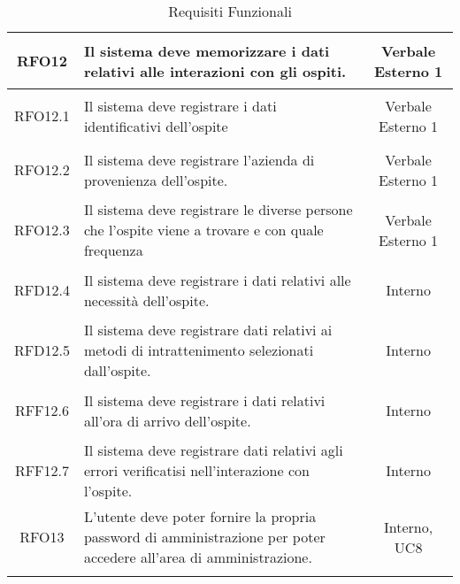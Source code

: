 \begin{longtable}{|c|>{\centering}m{7cm}|c|}
\hypertarget{RFO12}{RFO12} & Il sistema deve memorizzare i dati relativi alle interazioni con gli ospiti. & Verbale Esterno 1\\ \hline
\hypertarget{RFO12.1}{RFO12.1} & Il sistema deve registrare i dati identificativi dell'ospite & Verbale Esterno 1\\ \hline
\hypertarget{RFO12.2}{RFO12.2} & Il sistema deve registrare l'azienda di provenienza dell'ospite. & Verbale Esterno 1\\ \hline
\hypertarget{RFO12.3}{RFO12.3} & Il sistema deve registrare le diverse persone che l'ospite viene a trovare e con quale frequenza & Verbale Esterno 1\\ \hline
\hypertarget{RFD12.4}{RFD12.4} & Il sistema deve registrare i dati relativi alle necessità  dell'ospite. & Interno\\ \hline
\hypertarget{RFD12.5}{RFD12.5} & Il sistema deve registrare dati relativi ai metodi di intrattenimento selezionati dall'ospite. & Interno\\ \hline
\hypertarget{RFF12.6}{RFF12.6} & Il sistema deve registrare i dati relativi all'ora di arrivo dell'ospite. & Interno\\ \hline
\hypertarget{RFF12.7}{RFF12.7} & Il sistema deve registrare dati relativi agli errori verificatisi nell'interazione con l'ospite. & Interno\\ \hline
\hypertarget{RFO13}{RFO13} & L'utente deve poter fornire la propria password di amministrazione per poter accedere all'area di amministrazione. & Interno, UC8\\ \hline

\caption[Requisiti Funzionali]{Requisiti Funzionali}
\label{tabella:req0}
\end{longtable}
\clearpage
